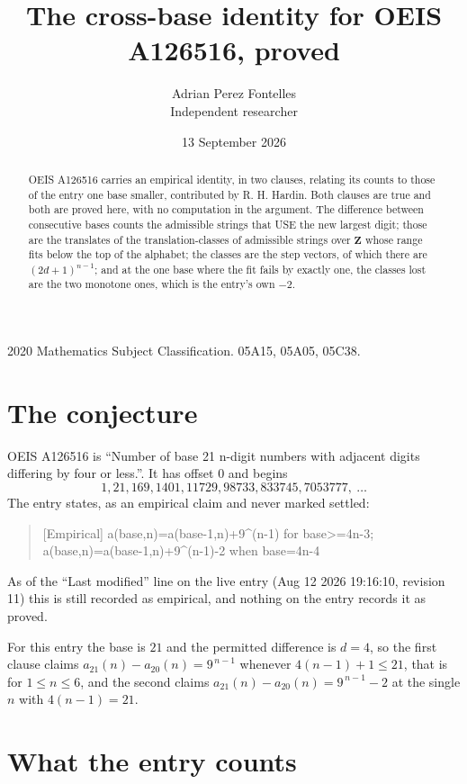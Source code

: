 \documentclass[11pt,a4paper]{article}
\title{The cross-base identity for OEIS A126516, proved}
\author{Adrian Perez Fontelles\\ \small Independent researcher}
\date{13 September 2026}
\theoremstyle{plain}
\theoremstyle{definition}
\begin{document}
\maketitle

\begin{abstract}
OEIS A126516 carries an empirical identity, in two clauses, relating its counts to those of the
entry one base smaller, contributed by R. H. Hardin. Both clauses are true and both are proved
here, with no computation in the argument. The difference between consecutive bases counts the
admissible strings that USE the new largest digit; those are the translates of the
translation-classes of admissible strings over $\mathbf{Z}$ whose range fits below the top of
the alphabet; the classes are the step vectors, of which there are $(2d+1)^{n-1}$; and at the
one base where the fit fails by exactly one, the classes lost are the two monotone ones, which
is the entry's own $-2$.
\end{abstract}

\noindent\small 2020 Mathematics Subject Classification. 05A15, 05A05, 05C38.\normalsize

\section{The conjecture}

OEIS A126516 is ``Number of base 21 n-digit numbers with adjacent digits differing by four or less.''. It has offset $0$ and begins
\[
1, 21, 169, 1401, 11729, 98733, 833745, 7053777,\ \dots
\]
The entry states, as an empirical claim and never marked settled:
\begin{quote}
[Empirical] a(base,n)=a(base-1,n)+9\textasciicircum{}(n-1) for base>=4n-3; a(base,n)=a(base-1,n)+9\textasciicircum{}(n-1)-2 when base=4n-4
\end{quote}
As of the ``Last modified'' line on the live entry (Aug 12 2026 19:16:10, revision 11)
this is still recorded as empirical, and nothing on the entry records it as proved.

For this entry the base is $21$ and the permitted difference is $d=4$, so the first clause
claims $a_{21}(n)-a_{20}(n)=9^{\,n-1}$ whenever $4(n-1)+1\le21$, that is for
$1\le n\le6$, and the second claims $a_{21}(n)-a_{20}(n)=9^{\,n-1}-2$ at the single
$n$ with $4(n-1)=21$.

\section{What the entry counts}
\end{document}
